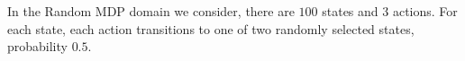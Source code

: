 
In the Random \ac{MDP} domain we consider, there are $100$ states and $3$ actions. For each state, each action transitions to one of two randomly selected states, probability $0.5$.


